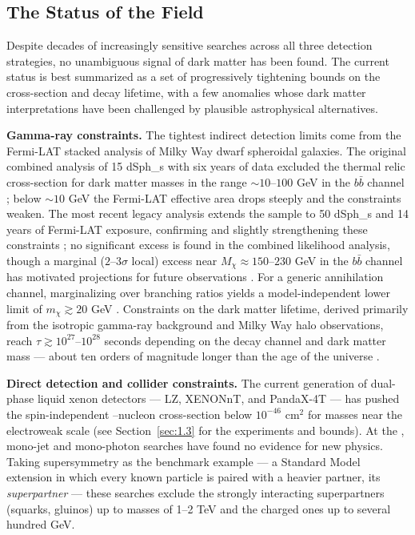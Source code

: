\subsection{The Status of the Field}
\label{sec:status}

Despite decades of increasingly sensitive searches across all three detection strategies, no unambiguous signal of dark matter has been found.
The current status is best summarized as a set of progressively tightening bounds on the cross-section and decay lifetime, with a few anomalies whose dark matter interpretations have been challenged by plausible astrophysical alternatives.

\textbf{Gamma-ray constraints.}
The tightest indirect detection limits come from the Fermi-LAT stacked analysis of Milky Way dwarf spheroidal galaxies.
The original combined analysis of 15 \glspl{dSph_} with six years of data excluded the thermal relic cross-section for dark matter masses in the range $\sim 10$--$100$ GeV in the $b\bar{b}$ channel \cite{Fermi-LAT:2015att,2024PhRvD.109f3024M}; below $\sim 10$ GeV the Fermi-LAT effective area drops steeply and the constraints weaken.
The most recent legacy analysis extends the sample to 50 \glspl{dSph_} and 14 years of Fermi-LAT exposure, confirming and slightly strengthening these constraints \cite{2024PhRvD.109f3024M}; no significant excess is found in the combined likelihood analysis, though a marginal ($2$--$3\sigma$ local) excess near $M_\chi \approx 150$--$230$ GeV in the $b\bar{b}$ channel has motivated projections for future observations \cite{2024PhRvD.109f3024M}.
For a generic annihilation channel, marginalizing over branching ratios yields a model-independent lower limit of $m_\chi \gtrsim 20$ GeV \cite{Cirelli:2024ssz}.
Constraints on the dark matter lifetime, derived primarily from the isotropic gamma-ray background and Milky Way halo observations, reach $\tau \gtrsim 10^{27}$--$10^{28}$ seconds depending on the decay channel and dark matter mass --- about ten orders of magnitude longer than the age of the universe \cite{Cohen:2016uyg,Blanco_2019}.

\textbf{Direct detection and collider constraints.}
The current generation of dual-phase liquid xenon detectors --- LZ, XENONnT, and PandaX-4T --- has pushed the spin-independent \WIMP--nucleon cross-section below $10^{-46}$ cm$^2$ for masses near the electroweak scale (see Section~\ref{sec:1.3} for the experiments and bounds).
At the \LHC, mono-jet and mono-photon searches have found no evidence for new physics.
Taking supersymmetry as the benchmark example --- a Standard Model extension in which every known particle is paired with a heavier partner, its \emph{superpartner} --- these searches exclude the strongly interacting superpartners (squarks, gluinos) up to masses of 1--2 TeV and the charged ones up to several hundred GeV.

